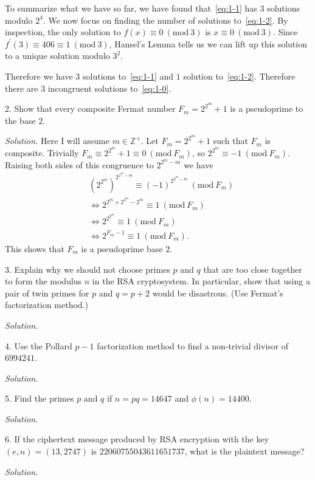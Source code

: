 \documentclass{article}
\newcommand{\Mod}[1]{\ (\mathrm{mod}\ #1)}
\newcommand{\Z}{\mathbb{Z}}
\begin{document}
To summarize what we have so far, we have found that~\eqref{eq:1-1} has
$3$ solutions modulo $2^4$. We now focus on finding the number of solutions
to~\eqref{eq:1-2}. By inspection, the only solution to $f(x) \equiv 0 \Mod 3$
is $x \equiv 0 \Mod 3$. Since $f^\prime(3) \equiv 406 \equiv 1 \Mod 3$,
Hansel's Lemma tells us we can lift up this solution to a unique solution
modulo $3^2$.

Therefore we have $3$ solutions to~\eqref{eq:1-1} and $1$ solution
to~\eqref{eq:1-2}. Therefore there are $3$ incongruent solutions
to~\eqref{eq:1-0}.

\newpage

2. Show that every composite Fermat number $F_m = 2^{2^m} + 1$ is a
pseudoprime to the base $2$.

\textit{Solution.}
Here I will assume $m \in \Z^+$. Let $F_m= 2^{2^m} + 1$ such that $F_m$
is composite. Trivially $F_m \equiv 2^{2^m} + 1 \equiv 0 \Mod{F_m}$,
so $2^{2^m} \equiv -1 \Mod{F_m}$. Raising both sides of this congruence
to $2^{2^m - m}$ we have
%
\begin{align*}
    &(2^{2^m})^{2^{2^m - m}} \equiv (-1)^{2^{2^m - m}} \Mod{F_m} \\
    &\iff 2^{2^m + 2^{2^m} - 2^m} \equiv 1 \Mod{F_m} \\
    &\iff 2^{2^{2^m}} \equiv 1 \Mod{F_m} \\
    &\iff 2^{F_m - 1} \equiv 1 \Mod{F_m}
    .
\end{align*}
%
This shows that $F_m$ is a pseudoprime base $2$.

\newpage

3. Explain why we should not choose primes $p$ and $q$ that are too close
together to form the modulus $n$ in the RSA cryptosystem. In particular,
show that using a pair of twin primes for $p$ and $q = p + 2$ would be
disastrous. (Use Fermat's factorization method.)

\textit{Solution.}

\newpage

4. Use the Pollard $p - 1$ factorization method to find a non-trivial
divisor of $6994241$.

\textit{Solution.}

\newpage

5. Find the primes $p$ and $q$ if $n = p q = 14647$ and $\phi(n) = 14400$.

\textit{Solution.}

\newpage

6. If the ciphertext message produced by RSA encryption with the key
$(e, n) = (13, 2747)$ is $22060755043611651737$, what is the plaintext
message?

\textit{Solution.}
\end{document}
